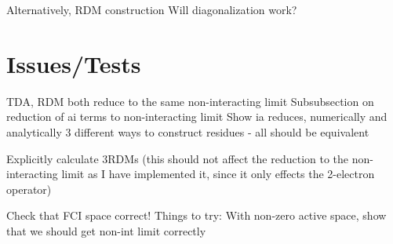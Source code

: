 \documentclass[a4paper,oneside,11pt]{article}
\numberwithin{equation}{section}
\begin{document}
Alternatively, 
RDM construction
Will diagonalization work?

\section{Issues/Tests}

TDA, RDM both reduce to the same non-interacting limit
Subsubsection on reduction of ai terms to non-interacting limit
Show ia reduces, numerically and analytically
3 different ways to construct residues - all should be equivalent

Explicitly calculate 3RDMs (this should not affect the reduction to the non-interacting limit as I have implemented it, since it only effects the 2-electron operator)

Check that FCI space correct!
Things to try: With non-zero active space, show that we should get non-int limit correctly
\end{document}
